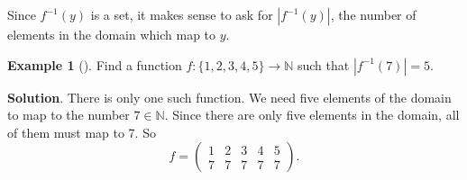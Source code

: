 \documentclass[10pt,]{book}
\theoremstyle{plain}
\theoremstyle{definition}
\theoremstyle{definition}
\newtheorem{example}[theorem]{Example}
\theoremstyle{definition}
\theoremstyle{definition}
\numberwithin{equation}{chapter}
\def\N{\mathbb N}
\def\inv{^{-1}}
\newcommand{\card}[1]{\left| #1 \right|}
\newcommand{\amp}{&}
\begin{document}
\hypertarget{p-1770}{}%
Since \(f\inv(y)\) is a set, it makes sense to ask for \(\card{f\inv(y)}\), the number of elements in the domain which map to \(y\).%
\begin{example}[]\label{example-54}
\hypertarget{p-1771}{}%
Find a function \(f:\{1,2,3,4,5\} \to \N\) such that \(\card{f\inv(7)} = 5\).%
\par\smallskip%
\noindent\textbf{Solution}.\hypertarget{solution-149}{}\quad%
\hypertarget{p-1772}{}%
There is only one such function. We need five elements of the domain to map to the number \(7 \in \N\). Since there are only five elements in the domain, all of them must map to 7. So%
\begin{equation*}
f = \begin{pmatrix}1 \amp 2 \amp 3 \amp 4 \amp 5 \\ 7 \amp 7 \amp 7 \amp 7 \amp 7\end{pmatrix}.
\end{equation*}
%
\end{example}
\end{document}
